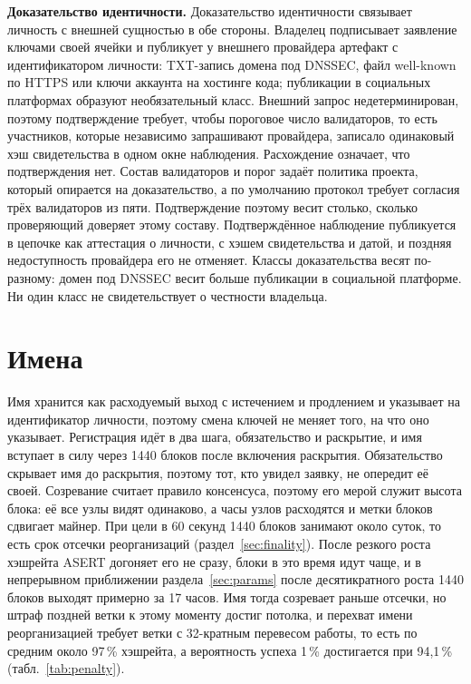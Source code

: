 \documentclass[10pt,a4paper]{article}
\begin{document}
\textbf{Доказательство идентичности.}
Доказательство идентичности связывает личность с внешней сущностью в обе стороны.
Владелец подписывает заявление ключами своей ячейки и публикует у внешнего провайдера артефакт с идентификатором личности: TXT-запись домена под DNSSEC, файл well-known по HTTPS или ключи аккаунта на хостинге кода; публикации в социальных платформах образуют необязательный класс.
Внешний запрос недетерминирован, поэтому подтверждение требует, чтобы пороговое число валидаторов, то есть участников, которые независимо запрашивают провайдера, записало одинаковый хэш свидетельства в одном окне наблюдения.
Расхождение означает, что подтверждения нет.
Состав валидаторов и порог задаёт политика проекта, который опирается на доказательство, а по умолчанию протокол требует согласия трёх валидаторов из пяти.
Подтверждение поэтому весит столько, сколько проверяющий доверяет этому составу.
Подтверждённое наблюдение публикуется в цепочке как аттестация о личности, с хэшем свидетельства и датой, и поздняя недоступность провайдера его не отменяет.
Классы доказательства весят по-разному: домен под DNSSEC весит больше публикации в социальной платформе.
Ни один класс не свидетельствует о честности владельца.

\section{Имена}
\label{sec:names}

Имя хранится как расходуемый выход с истечением и продлением и указывает на идентификатор личности, поэтому смена ключей не меняет того, на что оно указывает.
Регистрация идёт в два шага, обязательство и раскрытие, и имя вступает в силу через 1440 блоков после включения раскрытия.
Обязательство скрывает имя до раскрытия, поэтому тот, кто увидел заявку, не опередит её своей.
Созревание считает правило консенсуса, поэтому его мерой служит высота блока: её все узлы видят одинаково, а часы узлов расходятся и метки блоков сдвигает майнер.
При цели в 60 секунд 1440 блоков занимают около суток, то есть срок отсечки реорганизаций (раздел~\ref{sec:finality}).
После резкого роста хэшрейта ASERT догоняет его не сразу, блоки в это время идут чаще, и в непрерывном приближении раздела~\ref{sec:params} после десятикратного роста 1440 блоков выходят примерно за 17 часов.
Имя тогда созревает раньше отсечки, но штраф поздней ветки к этому моменту достиг потолка, и перехват имени реорганизацией требует ветки с 32-кратным перевесом работы, то есть по средним около 97\,\% хэшрейта, а вероятность успеха 1\,\% достигается при 94,1\,\% (табл.~\ref{tab:penalty}).
\end{document}
